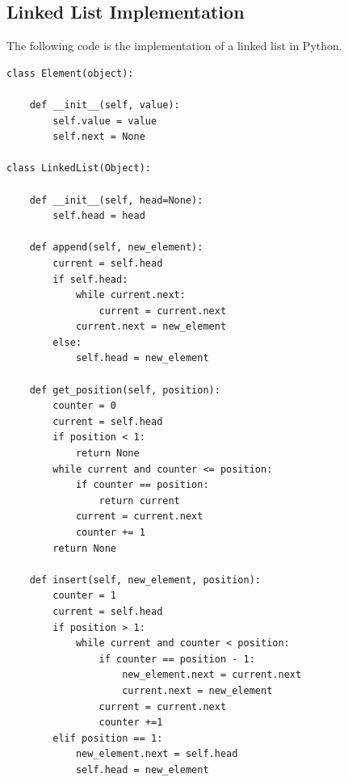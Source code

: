 \subsection{Linked List Implementation}
The following code is the implementation of a linked list in Python.
\begin{lstlisting}[caption={Linked List implementation.}]
class Element(object):

	def __init__(self, value):
		self.value = value
		self.next = None
		
class LinkedList(Object):

	def __init__(self, head=None):
		self.head = head
		
	def append(self, new_element):
		current = self.head
		if self.head:
			while current.next:
				current = current.next
			current.next = new_element
		else:
			self.head = new_element
	
	def get_position(self, position):
		counter = 0
		current = self.head
		if position < 1:
			return None
		while current and counter <= position:
			if counter == position:
				return current
			current = current.next
			counter += 1
		return None
	
	def insert(self, new_element, position):
		counter = 1
		current = self.head
		if position > 1:
			while current and counter < position:
				if counter == position - 1:
					new_element.next = current.next
					current.next = new_element
				current = current.next
				counter +=1 
		elif position == 1:
			new_element.next = self.head
			self.head = new_element
\end{lstlisting}
\newpage
